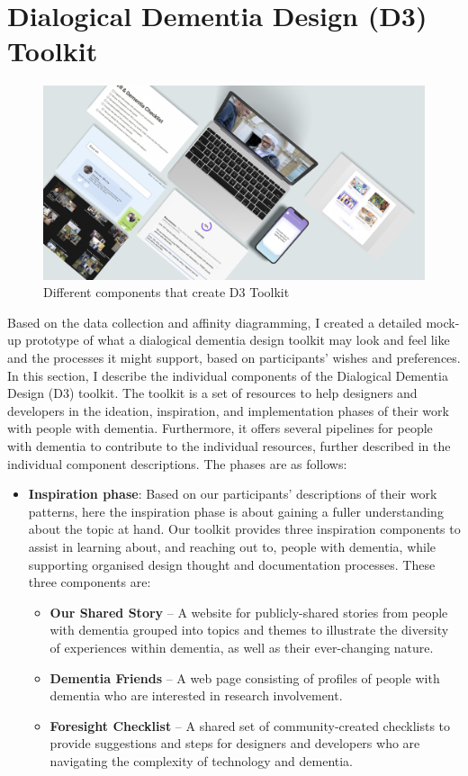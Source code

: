 \section{Dialogical Dementia Design (D3) Toolkit}
\label{D3:Toolit}

\begin{figure}[h]
\centering
\includegraphics[width=1\linewidth]{Images/D3Toolkit/Fig4.png}
\caption{Different components that create D3 Toolkit}
\label{fig:D3Overview}
\end{figure}
Based on the data collection and affinity diagramming, I created a detailed mock-up prototype of what a dialogical dementia design toolkit may look and feel like and the processes it might support, based on participants’ wishes and preferences. In this section, I describe the individual components of the Dialogical Dementia Design (D3) toolkit. The toolkit is a set of resources to help designers and developers in the ideation, inspiration, and implementation phases of their work with people with dementia. Furthermore, it offers several pipelines for people with dementia to contribute to the individual resources, further described in the individual component descriptions. The phases are as follows:

\begin{itemize}
    \item 
\textbf{Inspiration phase}: Based on our participants’ descriptions of their work patterns, here the inspiration phase is about gaining a fuller understanding about the topic at hand. Our toolkit provides three inspiration components to assist in learning about, and reaching out to, people with dementia, while supporting organised design thought and documentation processes. These three components are:
\begin{itemize}
    \item \textbf{Our Shared Story }– A website for publicly-shared stories from people with dementia grouped into topics and themes to illustrate the diversity of experiences within dementia, as well as their ever-changing nature.
    \item \textbf{Dementia Friends} – A web page consisting of profiles of people with dementia who are interested in research involvement. 
    \item \textbf{Foresight Checklist }– A shared set of community-created checklists to provide suggestions and steps for designers and developers who are navigating the complexity of technology and dementia.
\end{itemize}
\end{itemize}


